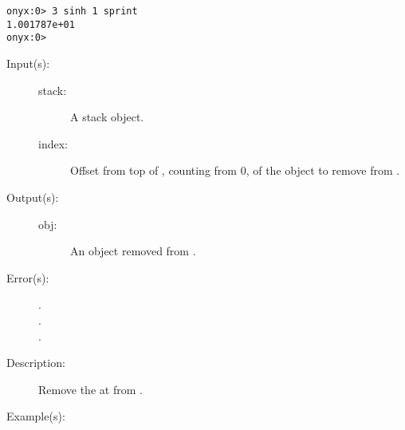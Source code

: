 \begin{description}
\begin{description}
\begin{verbatim}
onyx:0> 3 sinh 1 sprint
1.001787e+01
onyx:0>
		\end{verbatim}
	\end{description}
\label{systemdict:sipop}
\item[{\onyxop{stack index}{sipop}{obj}}: ]
	\begin{description}\item[]
	\item[Input(s): ]
		\begin{description}\item[]
		\item[stack: ]
			A stack object.
		\item[index: ]
			Offset from top of , counting from 0, of
			the object to remove from .
		\end{description}
	\item[Output(s): ]
		\begin{description}\item[]
		\item[obj: ]
			An object removed from .
		\end{description}
	\item[Error(s): ]
		\begin{description}\item[]
		\item[.]
		\item[.]
		\item[.]
		\end{description}
	\item[Description: ]
		Remove the  at  from .
	\item[Example(s): ]\begin{verbatim}


\end{verbatim}
\end{description}
\end{description}
